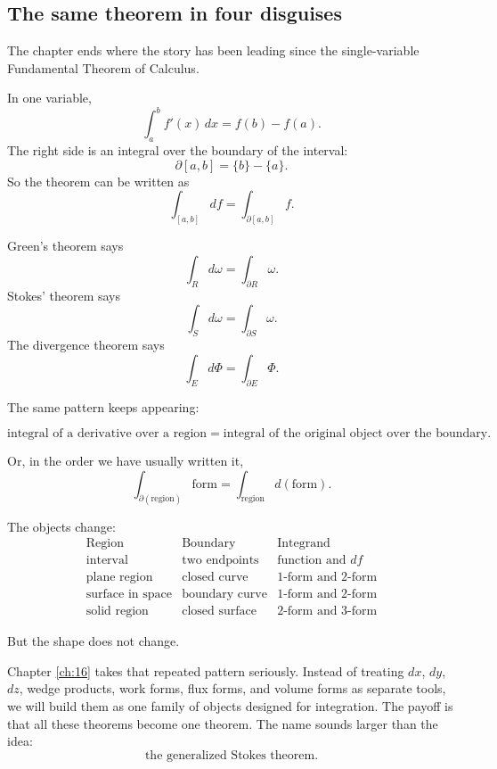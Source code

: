 \subsection{The same theorem in four disguises}

The chapter ends where the story has been leading since the single-variable
Fundamental Theorem of Calculus.

In one variable,
\[
    \int_a^b f'(x)\,dx=f(b)-f(a).
\]
The right side is an integral over the boundary of the interval:
\[
    \partial[a,b]=\{b\}-\{a\}.
\]
So the theorem can be written as
\[
    \int_{[a,b]}df=\int_{\partial[a,b]}f.
\]

Green's theorem says
\[
    \int_R d\omega=\int_{\partial R}\omega.
\]
Stokes' theorem says
\[
    \int_S d\omega=\int_{\partial S}\omega.
\]
The divergence theorem says
\[
    \int_E d\Phi=\int_{\partial E}\Phi.
\]

The same pattern keeps appearing:

\[
\boxed{
    \text{integral of a derivative over a region}
    =
    \text{integral of the original object over the boundary}.
}
\]

Or, in the order we have usually written it,
\[
\boxed{
    \int_{\partial(\text{region})}\text{form}
    =
    \int_{\text{region}}d(\text{form}).
}
\]

The objects change:
\[
\begin{array}{c|c|c}
\text{Region} & \text{Boundary} & \text{Integrand} \\ \hline
\text{interval} & \text{two endpoints} & \text{function and }df\\[1mm]
\text{plane region} & \text{closed curve} & 1\text{-form and }2\text{-form}\\[1mm]
\text{surface in space} & \text{boundary curve} & 1\text{-form and }2\text{-form}\\[1mm]
\text{solid region} & \text{closed surface} & 2\text{-form and }3\text{-form}
\end{array}
\]

But the shape does not change.

Chapter \ref{ch:16} takes that repeated pattern seriously.  Instead of treating
\(dx\), \(dy\), \(dz\), wedge products, work forms, flux forms, and volume forms as
separate tools, we will build them as one family of objects designed for integration.
The payoff is that all these theorems become one theorem.  The name sounds larger
than the idea:
\[
    \text{the generalized Stokes theorem.}
\]